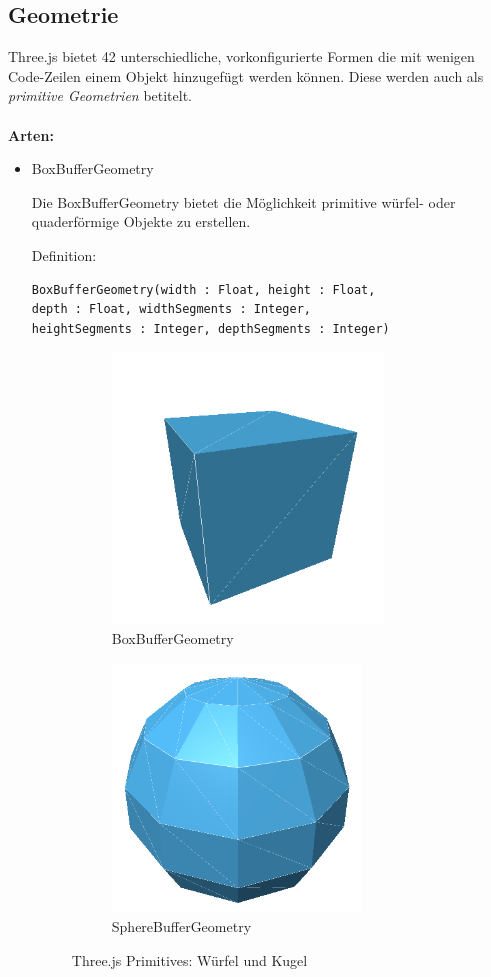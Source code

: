 \subsection{Geometrie}
Three.js bietet 42 unterschiedliche, vorkonfigurierte Formen die mit wenigen Code-Zeilen einem Objekt hinzugefügt werden können. Diese werden auch als \textit{primitive Geometrien} betitelt. \\
\\
\textbf{Arten:}  \cite{geometry_types} \\
\begin{itemize}
    \item BoxBufferGeometry 
  
Die BoxBufferGeometry bietet die Möglichkeit primitive würfel- oder quaderförmige Objekte zu erstellen.

Definition:
\begin{lstlisting}
BoxBufferGeometry(width : Float, height : Float, 
depth : Float, widthSegments : Integer, 
heightSegments : Integer, depthSegments : Integer)
\end{lstlisting}
\begin{figure}[h]
    \begin{subfigure}{0.5\textwidth}
    \centering
    \includegraphics[width=0.5\linewidth]{images/cube.png} 
    \caption{BoxBufferGeometry}
    \label{fig:subim1}
    \end{subfigure}
    \begin{subfigure}{0.5\textwidth}
    \centering
    \includegraphics[width=0.5\linewidth]{images/kugel.png}
    \caption{SphereBufferGeometry}
    \label{fig:subim2}
    \end{subfigure}
\caption{Three.js Primitives: Würfel und Kugel \cite{geometry_types}}
\label{fig:image2}
\end{figure}


\end{itemize}
